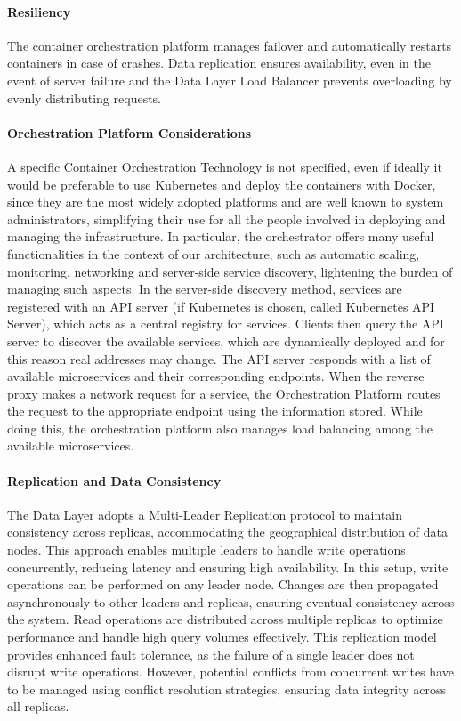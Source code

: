 \paragraph{Resiliency}
The container orchestration platform manages failover and automatically restarts containers in case of crashes.
Data replication ensures availability, even in the event of server failure and the Data Layer Load Balancer prevents overloading by evenly distributing requests.

\paragraph{Orchestration Platform Considerations}
A specific Container Orchestration Technology is not specified, even if ideally it would be preferable to use Kubernetes and deploy the containers with Docker, since they are the most widely adopted platforms and are well known to system administrators, simplifying their use for all the people involved in deploying and managing the infrastructure.
In particular, the orchestrator offers many useful functionalities in the context of our architecture, such as automatic scaling, monitoring, networking and server-side service discovery, lightening the burden of managing such aspects.
In the server-side discovery method, services are registered with an API server (if Kubernetes is chosen, called Kubernetes API Server), which acts as a central registry for services. Clients then query the API server to discover the available services, which are dynamically deployed and for this reason real addresses may change. The API server responds with a list of available microservices and their corresponding endpoints. When the reverse proxy makes a network request for a service, the Orchestration Platform routes the request to the appropriate endpoint using the information stored. While doing this, the orchestration platform also manages load balancing among the available microservices.

\paragraph{Replication and Data Consistency}
The Data Layer adopts a Multi-Leader Replication protocol to maintain consistency across replicas, accommodating the geographical distribution of data nodes. This approach enables multiple leaders to handle write operations concurrently, reducing latency and ensuring high availability.
In this setup, write operations can be performed on any leader node. Changes are then propagated asynchronously to other leaders and replicas, ensuring eventual consistency across the system.
Read operations are distributed across multiple replicas to optimize performance and handle high query volumes effectively.
This replication model provides enhanced fault tolerance, as the failure of a single leader does not disrupt write operations. However, potential conflicts from concurrent writes have to be managed using conflict resolution strategies, ensuring data integrity across all replicas.

